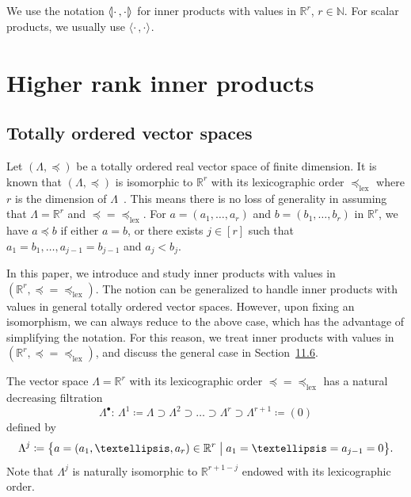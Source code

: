 \documentclass[10pt,a4paper]{amsart}
\newcommand{\innone}[2]{{\langle#2\rangle_{#1}}}
\newcommand{\llangle}{\mathopen{\langle\mkern -3.1mu\lvert}}
\newcommand{\rrangle}{\mathclose{\rvert\mkern -3.1mu\rangle}}
\newcommand{\highinn}[2]{{\llangle#2\rrangle_{#1}}}
\newcommand{\R}{\mathbb{R}}
\newcommand{\N}{\mathbb{N}}
\newcommand{\lexeq}{\preceq_{\mathrm{lex}}}
\theoremstyle{definition}\newtheorem{defi}[cdrthm]{Definition}
\begin{document}
We use the notation $\highinn{}{\cdot\,,\cdot}$ for inner products with values in $\R^r$, $r\in \N$. For scalar products, we usually use $\innone{}{\cdot\,,\cdot}$.

\section{Higher rank inner products} \label{sec:HigherRankInnerProducts}

\subsection{Totally ordered vector spaces}



Let $(\Lambda, \preceq)$ be a totally ordered real vector space of finite dimension. It is known that $(\Lambda, \preceq)$ is isomorphic to $\R^r$ with its lexicographic order $\lexeq$ where $r$ is the dimension of $\Lambda$~\cite{Bir-Lattice, HW52}. This means there is no loss of generality in assuming that $\Lambda = \R^r$ and $\preceq =\lexeq$. For $a =(a_1, \dots, a_r)$ and $b=(b_1, \dots, b_r)$ in $\R^r$, we have $a \preceq b$ if either $a=b$, or there exists $j\in [r]$ such that $a_1=b_1, \dots, a_{j-1}=b_{j-1}$ and $a_j<b_j$.


In this paper, we introduce and study inner products with values in $(\R^r, \preceq=\lexeq)$. The notion can be generalized to handle inner products with values in general totally ordered vector spaces. However, upon fixing an isomorphism, we can always reduce to the above case, which has the advantage of simplifying the notation. For this reason, we treat inner products with values in $(\R^r, \preceq=\lexeq)$, and discuss the general case in Section~\href{https://ahl.centre-mersenne.org/articles/10.5802/ahl.257/}{11.6}.



The vector space $\Lambda = \R^r$ with its lexicographic order $\preceq=\lexeq$ has a natural decreasing filtration
\begin{equation}\label{eq:FiltrationRr}
\Lambda^\bullet \colon \, \Lambda^1 \coloneq \Lambda\supset \Lambda^2 \supset \dots \supset \Lambda^{r} \supset \Lambda^{r+1} \coloneq (0)
\end{equation}
defined by
\[
\Lambda^j \coloneqq \bigl\{a = (a_1, \dots, a_r) \in \R^r \bigm| a_1 = \dots =a_{j-1}=0\bigr\}.
\]
Note that $\Lambda^j$ is naturally isomorphic to $\R^{r+1-j}$ endowed with its lexicographic order.
\end{document}
